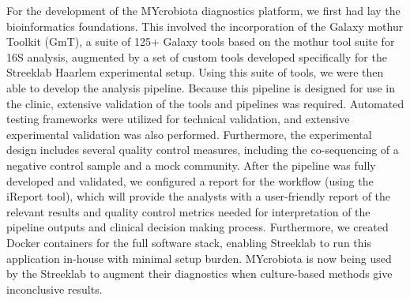 \begin{justify}
For the development of the MYcrobiota diagnostics platform, we first had lay the bioinformatics foundations. This involved the incorporation of the Galaxy  mothur Toolkit (GmT), a suite of 125+ Galaxy tools based on the mothur \cite{}  tool suite for 16S analysis, augmented by a set of custom tools developed specifically for the Streeklab Haarlem experimental setup. Using this suite of tools, we were then able to develop the analysis pipeline. Because this pipeline is designed for use in the clinic, extensive validation of the tools and pipelines was required. Automated testing frameworks were utilized for technical validation, and extensive experimental validation was also performed. Furthermore, the experimental design includes several quality control measures, including the co-sequencing of a negative control sample and a mock community. After the pipeline was fully developed and validated, we configured a report for the workflow (using the iReport tool), which will provide the analysts with a user-friendly report of the relevant results and quality control metrics needed for interpretation of the pipeline outputs and clinical decision making process. Furthermore, we created Docker containers for the full software stack, enabling Streeklab to run this application in-house with minimal setup burden. MYcrobiota is now being used by the Streeklab to augment their diagnostics when culture-based methods give inconclusive results.


\end{justify}



